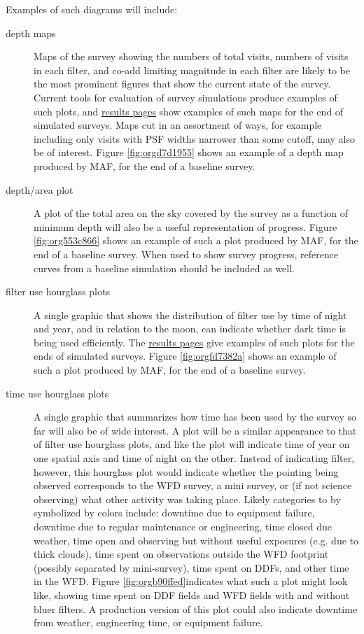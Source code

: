 Examples of such diagrams will include:

\begin{description}
\item[{depth maps}] Maps of the survey showing the numbers of total visits, numbers of visits in each filter, and co-add limiting magnitude in each filter are likely to be the most prominent figures that show the current state of the survey. Current tools for evaluation of survey simulations produce examples of such plots, and \href{http://astro-lsst-01.astro.washington.edu:8080/allMetricResults?runId=1#Nvisits\%20Maps}{results pages} show examples of such maps for the end of simulated surveys. Maps cut in an assortment of ways, for example including only visits with PSF widths narrower than some cutoff, may also be of interest. Figure \ref{fig:orgd7d1955} shows an example of a depth map produced by MAF, for the end of a baseline survey.
\item[{depth/area plot}] A plot of the total area on the sky covered by the survey as a function of minimum depth will also be a useful representation of progress. Figure \ref{fig:org553c866} shows an example of such a plot produced by MAF, for the end of a baseline survey. When used to show survey progress, reference curves from a baseline simulation should be included as well.
\item[{filter use hourglass plots}] A single graphic that shows the distribution of filter use by time of night and year, and in relation to the moon, can indicate whether dark time is being used efficiently. The \href{http://astro-lsst-01.astro.washington.edu:8080/allMetricResults?runId=2#Hourglass}{results pages} give examples of such plots for the ends of simulated surveys. Figure \ref{fig:orgfd7382a} shows an example of such a plot produced by MAF, for the end of a baseline survey.
\item[{time use hourglass plots}] A single graphic that summarizes how time has been used by the survey so far will also be of wide interest. A plot will be a similar appearance to that of filter use hourglass plots, and like the plot will indicate time of year on one spatial axis and time of night on the other. Instead of indicating filter, however, this hourglass plot would indicate whether the pointing being observed corresponds to the WFD survey, a mini survey, or (if not science observing) what other activity was taking place. Likely categories to by symbolized by colors include: downtime due to equipment failure, downtime due to regular maintenance or engineering, time closed due weather, time open and observing but without useful exposures (e.g. due to thick clouds), time spent on observations outside the WFD footprint (possibly separated by mini-survey), time spent on DDFs, and other time in the WFD. Figure \ref{fig:orgb90ffed}indicates what such a plot might look like, showing time spent on DDF fields and WFD fields with and without bluer filters. A production version of this plot could also indicate downtime from weather, engineering time, or equipment failure.

\end{description}
